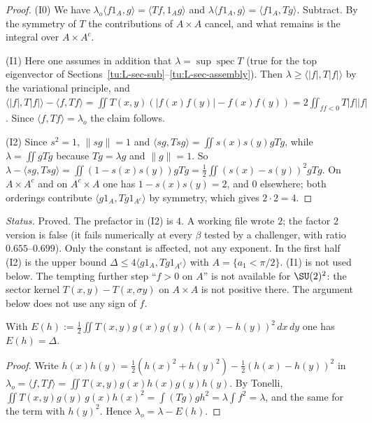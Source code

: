 \begin{proof}
(I0) We have $\lambda_o\langle f1_A,g\rangle=\langle Tf,1_Ag\rangle$ and
$\lambda\langle f1_A,g\rangle=\langle f1_A,Tg\rangle$. Subtract. By the symmetry of $T$ the
contributions of $A\times A$ cancel, and what remains is the integral over $A\times A^c$.

(I1) Here one assumes in addition that $\lambda=\sup\operatorname{spec}T$ (true for the top
eigenvector of Sections~\ref{tu:L-sec-sub}--\ref{tu:L-sec-assembly}). Then
$\lambda\ge\langle |f|,T|f|\rangle$ by the variational principle, and
$\langle |f|,T|f|\rangle-\langle f,Tf\rangle=\iint T(x,y)(|f(x)f(y)|-f(x)f(y))=2\iint_{ff<0}T|f||f|$.
Since $\langle f,Tf\rangle=\lambda_o$ the claim follows.

(I2) Since $s^2=1$, $\|sg\|=1$ and
$\langle sg,Tsg\rangle=\iint s(x)s(y)gTg$, while $\lambda=\iint gTg$ because $Tg=\lambda g$ and
$\|g\|=1$. So $\lambda-\langle sg,Tsg\rangle=\iint(1-s(x)s(y))gTg=\tfrac12\iint(s(x)-s(y))^2gTg$.
On $A\times A^c$ and on $A^c\times A$ one has $1-s(x)s(y)=2$, and $0$ elsewhere; both orderings
contribute $\langle g1_A,Tg1_{A^c}\rangle$ by symmetry, which gives $2\cdot 2=4$.
\end{proof}

\noindent\emph{Status.} Proved. The prefactor in (I2) is $4$. A working file wrote $2$; the factor $2$
version is false (it fails numerically at every $\beta$ tested by a challenger, with ratio
$0.655$--$0.699$). Only the constant is affected, not any exponent. In the first half (I2) is the
upper bound $\Delta\le 4\langle g1_A,Tg1_{A^c}\rangle$ with $A=\{a_1<\pi/2\}$.
(I1) is not used below. The tempting further step ``$f>0$ on $A$'' is not available for $\SU(2)^2$:
the sector kernel $T(x,y)-T(x,\sigma y)$ on $A\times A$ is not positive there. The argument below does
not use any sign of $f$.

\begin{lemma}\label{tu:L-GS}
With $E(h):=\tfrac12\iint T(x,y)g(x)g(y)(h(x)-h(y))^2\,dx\,dy$ one has $E(h)=\Delta$.
\end{lemma}

\begin{proof}
Write $h(x)h(y)=\tfrac12(h(x)^2+h(y)^2)-\tfrac12(h(x)-h(y))^2$ in
$\lambda_o=\langle f,Tf\rangle=\iint T(x,y)g(x)h(x)g(y)h(y)$. By Tonelli,
$\iint T(x,y)g(y)\,g(x)h(x)^2=\int (Tg)gh^2=\lambda\int f^2=\lambda$, and the same for the term with
$h(y)^2$. Hence $\lambda_o=\lambda-E(h)$.
\end{proof}

